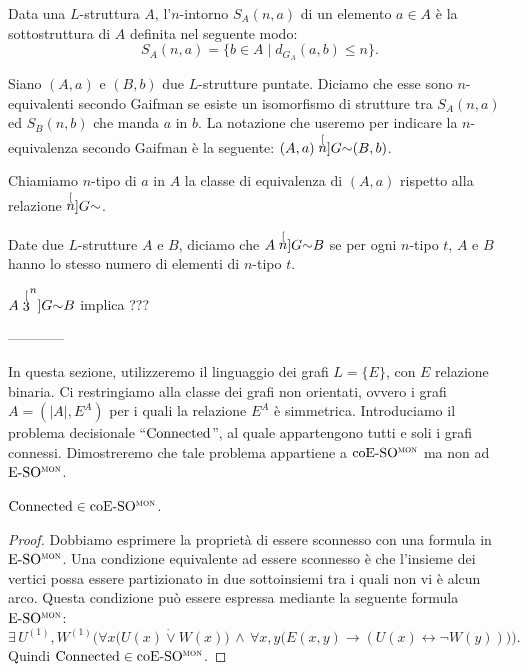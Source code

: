 \begin{definizione}
  Data una $L$-struttura $A$, l'$n$-intorno $S_A(n,a)$ di un elemento $a\in A$ è la sottostruttura di $A$ definita nel seguente modo:
  \[ S_A(n,a) = \{ b\in A \mid d_{G_A}(a,b) \leq n \}. \]
\end{definizione}

\begin{definizione}
  Siano $(A,a)$ e $(B,b)$ due $L$-strutture puntate. Diciamo che esse sono $n$-equivalenti secondo Gaifman se esiste un isomorfismo di strutture tra $S_A(n,a)$ ed $S_B(n,b)$ che manda $a$ in $b$.
  La notazione che useremo per indicare la $n$-equivalenza secondo Gaifman è la seguente: $(A,a) \stackrel[n]{G}{\sim} (B,b)$.
\end{definizione}

\begin{definizione}
  Chiamiamo $n$-tipo di $a$ in $A$ la classe di equivalenza di $(A,a)$ rispetto alla relazione $\stackrel[n]{G}{\sim}$.
\end{definizione}

\begin{definizione}
  Date due $L$-strutture $A$ e $B$, diciamo che $A\stackrel[n]{G}{\sim} B$ se per ogni $n$-tipo $t$, $A$ e $B$ hanno lo stesso numero di elementi di $n$-tipo $t$.
\end{definizione}


\begin{teorema}
  $A \stackrel[3^n]{G}{\sim} B$ implica ???
\end{teorema}



------------


In questa sezione, utilizzeremo il linguaggio dei grafi $L=\{E\}$, con $E$ relazione binaria.
Ci restringiamo alla classe dei grafi non orientati, ovvero i grafi $A=(|A|,E^A)$ per i quali la relazione $E^A$ è simmetrica.
Introduciamo il problema decisionale ``$\operatorname{Connected}$'', al quale appartengono tutti e soli i grafi connessi.
Dimostreremo che tale problema appartiene a $\operatorname{coE-SO^{\normalfont\textsc{mon}}}$ ma non ad $\operatorname{E-SO^{\normalfont\textsc{mon}}}$.

\begin{lemma}
  $\operatorname{Connected} \in \operatorname{coE-SO^{\normalfont\textsc{mon}}}$.
\end{lemma}

\begin{proof}
  Dobbiamo esprimere la proprietà di essere sconnesso con una formula in $\operatorname{E-SO^{\normalfont\textsc{mon}}}$.
  Una condizione equivalente ad essere sconnesso è che l'insieme dei vertici possa essere partizionato in due sottoinsiemi tra i quali non vi è alcun arco. Questa condizione può essere espressa mediante la seguente formula $\operatorname{E-SO^{\normalfont\textsc{mon}}}$:
  \[ \exists \, U^{(1)}, W^{(1)} \Big( \forall x \big( U(x) \dot\lor W(x) \big) \,\wedge\, \forall x,y \big( E(x,y) \rightarrow (U(x) \leftrightarrow \lnot W(y))\big) \Big). \]
  Quindi $\operatorname{Connected} \in \operatorname{coE-SO^{\normalfont\textsc{mon}}}$.
\end{proof}






